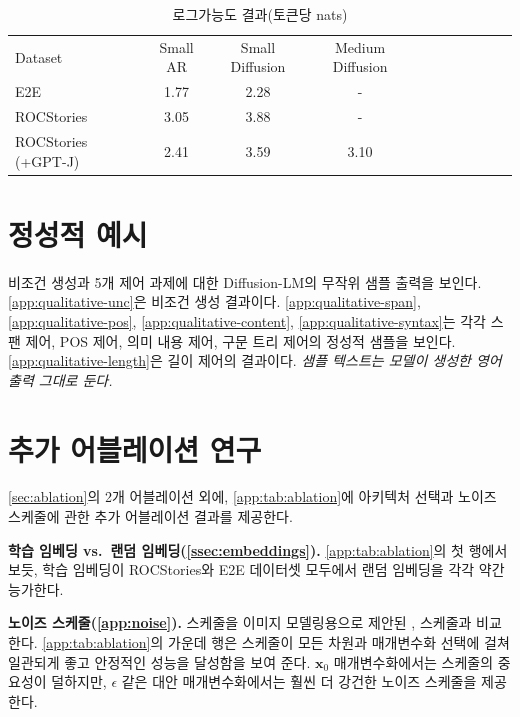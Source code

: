 \documentclass{article}
\newcommand{\cx}[1]{\mathbf{x}_{#1}}
\begin{document}
\begin{table}
    \centering
\begin{tabular}{lcc|cc|cc|cc|cc}
\toprule
    Dataset                & Small AR    & Small Diffusion     & Medium Diffusion\\
    E2E                    & 1.77    & 2.28 & -\\
    ROCStories             & 3.05    & 3.88 & -\\
    ROCStories (+GPT-J)    & 2.41    & 3.59 & 3.10\\

\bottomrule
\end{tabular}
\caption{\label{tab:ppl} 로그가능도 결과(토큰당 nats)}
\end{table}

\section{정성적 예시}
\label{app:qualitative}

비조건 생성과 5개 제어 과제에 대한 Diffusion-LM의 무작위 샘플 출력을 보인다. \cref{app:qualitative-unc}은 비조건 생성 결과이다.
\cref{app:qualitative-span}, \cref{app:qualitative-pos}, \cref{app:qualitative-content}, \cref{app:qualitative-syntax}는 각각 스팬 제어, POS 제어, 의미 내용 제어, 구문 트리 제어의 정성적 샘플을 보인다.
\cref{app:qualitative-length}은 길이 제어의 결과이다. \emph{샘플 텍스트는 모델이 생성한 영어 출력 그대로 둔다.}


\section{추가 어블레이션 연구}
\label{app:ablation}
\cref{sec:ablation}의 2개 어블레이션 외에, \cref{app:tab:ablation}에 아키텍처 선택과 노이즈 스케줄에 관한 추가 어블레이션 결과를 제공한다.

\textbf{학습 임베딩 vs.\ 랜덤 임베딩(\cref{ssec:embeddings}).}
\cref{app:tab:ablation}의 첫 행에서 보듯, 학습 임베딩이 ROCStories와 E2E 데이터셋 모두에서 랜덤 임베딩을 각각 약간 능가한다.


\textbf{노이즈 스케줄(\cref{app:noise}).}
\sqrtt 스케줄을 이미지 모델링용으로 제안된 \cosine \cite{nichol2021improved}, \linear \cite{ho2020denoising} 스케줄과 비교한다. \cref{app:tab:ablation}의 가운데 행은 \sqrtt 스케줄이 모든 차원과 매개변수화 선택에 걸쳐 일관되게 좋고 안정적인 성능을 달성함을 보여 준다. $\cx{0}$ 매개변수화에서는 \sqrtt 스케줄의 중요성이 덜하지만, $\epsilon$ 같은 대안 매개변수화에서는 훨씬 더 강건한 노이즈 스케줄을 제공한다.
\end{document}
